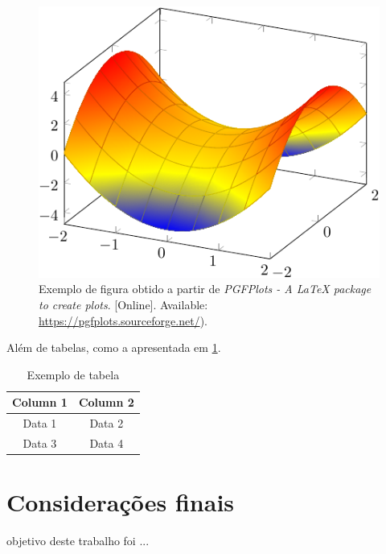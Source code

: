 \documentclass[9pt,a4paper,twoside]{tau}
\begin{document}
\begin{figure}[htbp]
    \centering
    \includegraphics[width=0.8\columnwidth]{assets/example.pdf}
    \caption{Exemplo de figura obtido a partir de \textit{PGFPlots - A LaTeX package to create plots}. [Online]. Available: \url{https://pgfplots.sourceforge.net/}).}
    \label{fig:figure}
\end{figure}

Além de tabelas, como a apresentada em \ref{tab:table}.

\begin{table}[htbp]
    \caption{Exemplo de tabela}
    \label{tab:table}
    \centering
    \begin{tabular}{cc}
        \toprule
        \textbf{Column 1} & \textbf{Column 2} \\
        \midrule
        Data 1            & Data 2            \\
        Data 3            & Data 4            \\
        \bottomrule
    \end{tabular}
\end{table}

\section{Considerações finais}

 objetivo deste trabalho foi ...

\printbibliography
\end{document}
